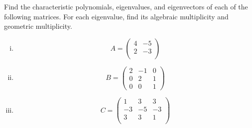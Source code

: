 \begin{question}
\normalfont
Find the characteristic polynomials, eigenvalues, and eigenvectors of each of the following matrices. For each eigenvalue, find its algebraic multiplicity and geometric multiplicity.
\begin{enumerate}[(i)]
\item
\[
A= \begin{pmatrix}
            4 & -5\\
            2 & -3\\
        \end{pmatrix}
\]

\item
\[
B= \begin{pmatrix}
            2 & -1 & 0\\
            0 & 2 & 1\\
            0 & 0 & 1
        \end{pmatrix}
\]
\item
\[
C= \begin{pmatrix}
            1 & 3 & 3\\
            -3 & -5 & -3\\
            3 & 3 & 1 \\
        \end{pmatrix}
\]
\end{enumerate}

\end{question}
